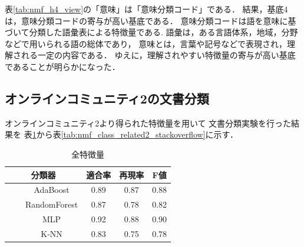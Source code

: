 \documentclass[12pt,a4paper,twocolumn,twoside]{jsik}
\begin{document}
表\ref{tab:nmf_h4_view}の「意味」は「意味分類コード」である．
結果，基底4は，意味分類コードの寄与が高い基底である．
意味分類コードは語を意味に基づいて分類した語彙表による特徴量である.
語彙は，ある言語体系，地域，分野などで用いられる語の総体であり，
意味とは，言葉や記号などで表現され，理解される一定の内容である．
ゆえに，理解されやすい特徴量の寄与が高い基底であることが明らかになった．

\newpage
\subsection{オンラインコミュニティ2の文書分類}\label{result_4}
オンラインコミュニティ2より得られた特徴量を用いて
文書分類実験を行った結果を
表\ref{tab:nmf_class_all_stackoverflow}から表\ref{tab:nmf_class_related2_stackoverflow}に示す．

\begin{table}[htb]
  \caption{全特徴量} 
  \label{tab:nmf_class_all_stackoverflow}
  \begin{center}
  \begin{tabular}{c|c|c|c} \hline
    分類器 & 適合率 & 再現率 & F値 \\ \hline \hline
　　AdaBoost & 0.89 & 0.87 & 0.88 \\ \hline
　　RandomForest & 0.87 & 0.78 & 0.82 \\ \hline
　　MLP & 0.92 & 0.88 & 0.90 \\ \hline
　　K-NN & 0.83 & 0.75 & 0.78 \\ \hline
  \end{tabular}
  \end{center}
\end{table}
\end{document}
